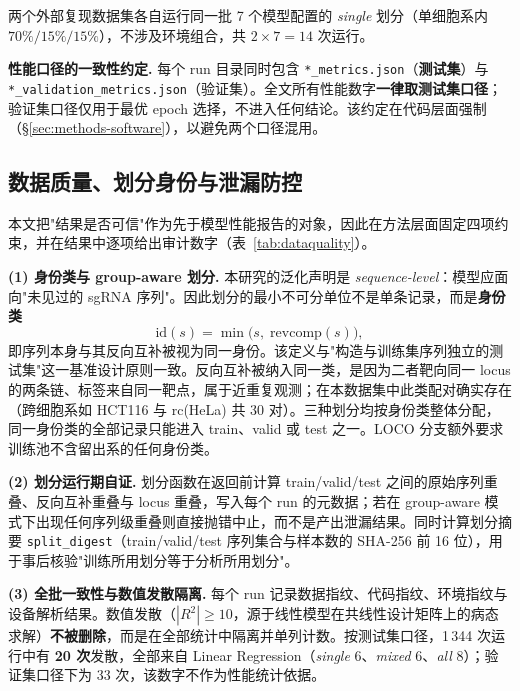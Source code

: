 两个外部复现数据集各自运行同一批 7 个模型配置的 \emph{single} 划分（单细胞系内 $70\%/15\%/15\%$），不涉及环境组合，共 $2\times7=14$ 次运行。

\textbf{性能口径的一致性约定.} 每个 run 目录同时包含 \texttt{*\_metrics.json}（\textbf{测试集}）与 \texttt{*\_validation\_metrics.json}（验证集）。全文所有性能数字\textbf{一律取测试集口径}；验证集口径仅用于最优 epoch 选择，不进入任何结论。该约定在代码层面强制（\S\ref{sec:methods-software}），以避免两个口径混用。

\subsection{数据质量、划分身份与泄漏防控}
\label{sec:methods-leakage}

本文把"结果是否可信"作为先于模型性能报告的对象，因此在方法层面固定四项约束，并在结果中逐项给出审计数字（表~\ref{tab:dataquality}）。

\textbf{(1) 身份类与 group-aware 划分.} 本研究的泛化声明是 \emph{sequence-level}：模型应面向"未见过的 sgRNA 序列"。因此划分的最小不可分单位不是单条记录，而是\textbf{身份类}
\begin{equation}
\mathrm{id}(s)=\min\bigl(s,\;\mathrm{revcomp}(s)\bigr),
\end{equation}
即序列本身与其反向互补被视为同一身份。该定义与"构造与训练集序列独立的测试集"这一基准设计原则一致\citep{Petti2022PLOSCB,Roberts2017Ecography}。反向互补被纳入同一类，是因为二者靶向同一 locus 的两条链、标签来自同一靶点，属于近重复观测；在本数据集中此类配对确实存在（跨细胞系如 HCT116 与 $\mathrm{rc}$(HeLa) 共 30 对）。三种划分均按身份类整体分配，同一身份类的全部记录只能进入 train、valid 或 test 之一。LOCO 分支额外要求训练池不含留出系的任何身份类。

\textbf{(2) 划分运行期自证.} 划分函数在返回前计算 train/valid/test 之间的原始序列重叠、反向互补重叠与 locus 重叠，写入每个 run 的元数据；若在 group-aware 模式下出现任何序列级重叠则直接抛错中止，而不是产出泄漏结果。同时计算划分摘要 \texttt{split\_digest}（train/valid/test 序列集合与样本数的 SHA-256 前 16 位），用于事后核验"训练所用划分等于分析所用划分"。

\textbf{(3) 全批一致性与数值发散隔离.} 每个 run 记录数据指纹、代码指纹、环境指纹与设备解析结果。数值发散（$|R^{2}|\ge10$，源于线性模型在共线性设计矩阵上的病态求解）\textbf{不被删除}，而是在全部统计中隔离并单列计数。按测试集口径，1\,344 次运行中有 \textbf{20 次}发散，全部来自 Linear Regression（\emph{single} 6、\emph{mixed} 6、\emph{all} 8）；验证集口径下为 33 次，该数字不作为性能统计依据。

